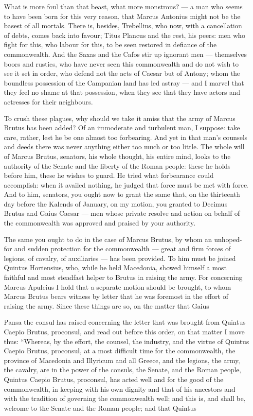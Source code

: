  What is more foul than that beast, what more monstrous? --- a man who seems to have been born for this very reason, that Marcus Antonius might not be the basest of all mortals. There is, besides, Trebellius, who now, with a cancellation of debts, comes back into favour; Titus Plancus and the rest, his peers: men who fight for this, who labour for this, to be seen restored in defiance of the commonwealth. And the Saxas and the Cafos stir up ignorant men --- themselves boors and rustics, who have never seen this commonwealth and do not wish to see it set in order, who defend not the acts of Caesar but of Antony; whom the boundless possession of the Campanian land has led astray --- and I marvel that they feel no shame at that possession, when they see that they have actors and actresses for their neighbours.

 To crush these plagues, why should we take it amiss that the army of Marcus Brutus has been added? Of an immoderate and turbulent man, I suppose: take care, rather, lest he be one almost too forbearing. And yet in that man's counsels and deeds there was never anything either too much or too little. The whole will of Marcus Brutus, senators, his whole thought, his entire mind, looks to the authority of the Senate and the liberty of the Roman people: these he holds before him, these he wishes to guard. He tried what forbearance could accomplish: when it availed nothing, he judged that force must be met with force. And to him, senators, you ought now to grant the same that, on the thirteenth day before the Kalends of January, on my motion, you granted to Decimus Brutus and Gaius Caesar --- men whose private resolve and action on behalf of the commonwealth was approved and praised by your authority.

 The same you ought to do in the case of Marcus Brutus, by whom an unhoped-for and sudden protection for the commonwealth --- great and firm forces of legions, of cavalry, of auxiliaries --- has been provided. To him must be joined Quintus Hortensius, who, while he held Macedonia, showed himself a most faithful and most steadfast helper to Brutus in raising the army. For concerning Marcus Apuleius I hold that a separate motion should be brought, to whom Marcus Brutus bears witness by letter that he was foremost in the effort of raising the army. Since these things are so, on the matter that Gaius

 Pansa the consul has raised concerning the letter that was brought from Quintus Caepio Brutus, proconsul, and read out before this order, on that matter I move thus: ``Whereas, by the effort, the counsel, the industry, and the virtue of Quintus Caepio Brutus, proconsul, at a most difficult time for the commonwealth, the province of Macedonia and Illyricum and all Greece, and the legions, the army, the cavalry, are in the power of the consuls, the Senate, and the Roman people, Quintus Caepio Brutus, proconsul, has acted well and for the good of the commonwealth, in keeping with his own dignity and that of his ancestors and with the tradition of governing the commonwealth well; and this is, and shall be, welcome to the Senate and the Roman people; and that Quintus

